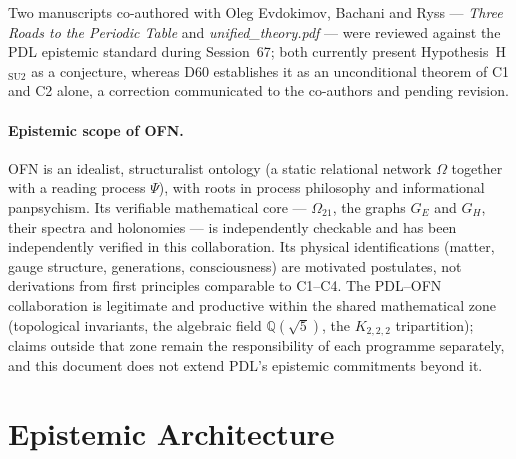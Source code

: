 \documentclass[11pt,a4paper]{article}
\theoremstyle{plain}
\theoremstyle{definition}
\theoremstyle{remark}
\begin{document}
Two manuscripts co-authored with Oleg Evdokimov, Bachani and Ryss --- \emph{Three Roads to the Periodic Table} and \emph{unified\_theory.pdf} --- were reviewed against the PDL epistemic standard during Session~67; both currently present Hypothesis~H$_{\mathrm{SU2}}$ as a conjecture, whereas D60 establishes it as an unconditional theorem of C1 and C2 alone, a correction communicated to the co-authors and pending revision.

\paragraph{Epistemic scope of OFN.} OFN is an idealist, structuralist ontology (a static relational network $\Omega$ together with a reading process $\Psi$), with roots in process philosophy and informational panpsychism. Its verifiable mathematical core --- $\Omega_{21}$, the graphs $G_E$ and $G_H$, their spectra and holonomies --- is independently checkable and has been independently verified in this collaboration. Its physical identifications (matter, gauge structure, generations, consciousness) are motivated postulates, not derivations from first principles comparable to C1--C4. The PDL--OFN collaboration is legitimate and productive within the shared mathematical zone (topological invariants, the algebraic field $\mathbb{Q}(\sqrt5)$, the $K_{2,2,2}$ tripartition); claims outside that zone remain the responsibility of each programme separately, and this document does not extend PDL's epistemic commitments beyond it.

\section{Epistemic Architecture}
\label{sec:epistemic}
\end{document}

